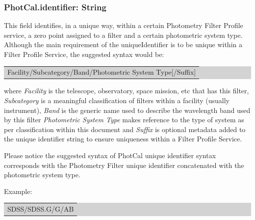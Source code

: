 \documentclass[11pt,a4paper]{ivoa}
\begin{document}
\subsubsection{PhotCal.identifier: String}
This field identifies, in a unique way, within a certain Photometry Filter Profile service, a zero point assigned to a filter and a certain photometric system type. Although the main requirement of the uniqueIdentifier is to be unique within a Filter Profile Service, the suggested syntax would be:
\par

\bigskip
\par
\begingroup\setlength{\fboxsep}{0pt}
\colorbox{lightgray}{%
\begin{tabular}{|p{5.53in}|}
Facility/Subcategory/Band/Photometric System Type[/Suffix]
\end{tabular}%
}\endgroup
\par
\bigskip


where \textit{Facility} is the telescope, observatory, space mission, etc that has this filter, \textit{Subcategory} is a meaningful classification of filters within a facility (usually instrument), \textit{Band} is the generic name used to describe the wavelength band used by this filter \textit{Photometric System Type} makes reference to the type of system as per classification within this document and \textit{Suffix} is optional metadata added to the unique identifier string to ensure uniqueness within a Filter Profile Service.
\par

Please notice the suggested syntax of PhotCal unique identifier syntax corresponds with the Photometry Filter unique identifier concatenated with the photometric system type.
\par

Example:
\par



\bigskip
\par
\begingroup\setlength{\fboxsep}{0pt}
\colorbox{lightgray}{%
\begin{tabular}{|p{5.53in}|}
SDSS/SDSS.G/G/AB
\end{tabular}%
}\endgroup
\par
\bigskip


\end{document}
